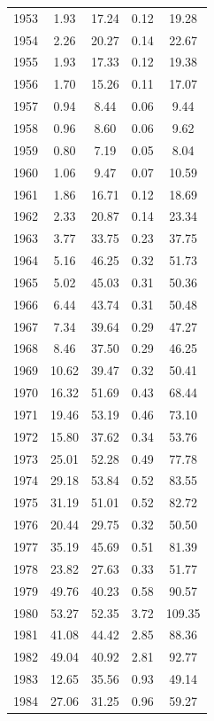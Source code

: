\documentclass[12pt,]{article}
\begin{document}
\begin{longtable}{ccccc}
  1953 & 1.93 & 17.24 & 0.12 & 19.28 \\ 
  1954 & 2.26 & 20.27 & 0.14 & 22.67 \\ 
  1955 & 1.93 & 17.33 & 0.12 & 19.38 \\ 
  1956 & 1.70 & 15.26 & 0.11 & 17.07 \\ 
  1957 & 0.94 & 8.44 & 0.06 & 9.44 \\ 
  1958 & 0.96 & 8.60 & 0.06 & 9.62 \\ 
  1959 & 0.80 & 7.19 & 0.05 & 8.04 \\ 
  1960 & 1.06 & 9.47 & 0.07 & 10.59 \\ 
  1961 & 1.86 & 16.71 & 0.12 & 18.69 \\ 
  1962 & 2.33 & 20.87 & 0.14 & 23.34 \\ 
  1963 & 3.77 & 33.75 & 0.23 & 37.75 \\ 
  1964 & 5.16 & 46.25 & 0.32 & 51.73 \\ 
  1965 & 5.02 & 45.03 & 0.31 & 50.36 \\ 
  1966 & 6.44 & 43.74 & 0.31 & 50.48 \\ 
  1967 & 7.34 & 39.64 & 0.29 & 47.27 \\ 
  1968 & 8.46 & 37.50 & 0.29 & 46.25 \\ 
  1969 & 10.62 & 39.47 & 0.32 & 50.41 \\ 
  1970 & 16.32 & 51.69 & 0.43 & 68.44 \\ 
  1971 & 19.46 & 53.19 & 0.46 & 73.10 \\ 
  1972 & 15.80 & 37.62 & 0.34 & 53.76 \\ 
  1973 & 25.01 & 52.28 & 0.49 & 77.78 \\ 
  1974 & 29.18 & 53.84 & 0.52 & 83.55 \\ 
  1975 & 31.19 & 51.01 & 0.52 & 82.72 \\ 
  1976 & 20.44 & 29.75 & 0.32 & 50.50 \\ 
  1977 & 35.19 & 45.69 & 0.51 & 81.39 \\ 
  1978 & 23.82 & 27.63 & 0.33 & 51.77 \\ 
  1979 & 49.76 & 40.23 & 0.58 & 90.57 \\ 
  1980 & 53.27 & 52.35 & 3.72 & 109.35 \\ 
  1981 & 41.08 & 44.42 & 2.85 & 88.36 \\ 
  1982 & 49.04 & 40.92 & 2.81 & 92.77 \\ 
  1983 & 12.65 & 35.56 & 0.93 & 49.14 \\ 
  1984 & 27.06 & 31.25 & 0.96 & 59.27 \\ 

\end{longtable}
\end{document}

